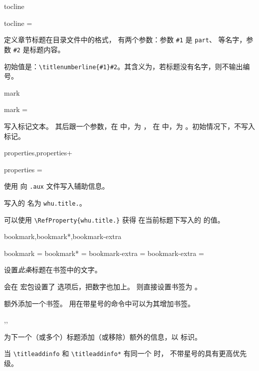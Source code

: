 \documentclass[twoside]{book}
\begin{document}
\begin{keyval}[path=title/...]{tocline}
  \begin{syntax}
    tocline = 
  \end{syntax}
定义章节标题在目录文件中的格式， 有两个参数：参数
\verb|#1| 是 \texttt{part}、 等名字，参数 \verb|#2| 是标题内容。

初始值是：\verb|\titlenumberline{#1}#2|。其含义为，若标题没有名字，则不输出编号。
\end{keyval}

\begin{keyval}[path=title/...]{mark}
  \begin{syntax}
    mark = 
  \end{syntax}
写入标记文本。 其后跟一个参数，在  中，为 ，
在  中，为 。初始情况下，不写入标记。
\end{keyval}

\begin{keyval}[path=title/...]{properties,properties+}
  \begin{syntax}
    properties = 
  \end{syntax}
使用  向 \texttt{.aux} 文件写入辅助信息。

写入的  名为 \texttt{whu.title.}。

可以使用 \verb|\RefProperty{whu.title.|\verb|}| 获得
在当前标题下写入的  的值。
\end{keyval}

\begin{keyval}[path=title/...]{bookmark,bookmark*,bookmark-extra}
  \begin{syntax}
    bookmark  = 
    bookmark* = 
    bookmark-extra = 
    bookmark-extra =  
  \end{syntax}
设置\emph{此条}标题在书签中的文字。

 会在  宏包设置了  选项后，把数字也加上。
\linebreak{} 则直接设置书签为 。

 额外添加一个书签。
用在带星号的命令中可以为其增加书签。
\end{keyval}

\begin{function}{\titleaddinfo,\titleremoveinfo,\titleremoveallinfo}
  \begin{syntax}
    \V\titleaddinfo   {} 
    \V\titleaddinfo *  
    \V\titleremoveinfo  {} 
    \V\titleremoveinfo *  
    \V\titleremoveallinfo 
    \V\titleremoveallinfo *
  \end{syntax}
为下一个（或多个）标题添加（或移除）额外的信息，以  标识。

当 \verb|\titleaddinfo| 和 \verb|\titleaddinfo*| 有同一个  时，
不带星号的具有更高优先级。
\end{function}
\end{document}
